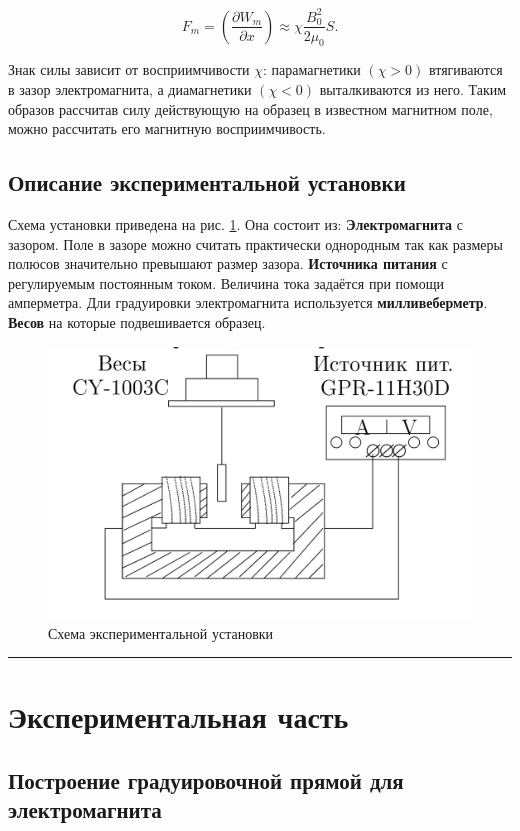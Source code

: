 \documentclass[a4paper,12pt]{article} %
\begin{document}
\[
F_m = \left( \frac{\partial W_m}{\partial x} \right) \approx \chi \frac{B_0^2}{2 \mu_0} S.
\]

Знак силы зависит от восприимчивости $\chi$: парамагнетики $(\chi > 0)$ втягиваются в зазор электромагнита, а диамагнетики $(\chi < 0)$ выталкиваются из него. Таким образов рассчитав силу действующую на образец в известном магнитном поле, можно рассчитать его магнитную восприимчивость.

\subsection{Описание экспериментальной установки}

Схема установки приведена на рис. \ref{fig:setup}. Она состоит из:
\textbf{Электромагнита} с зазором. Поле в зазоре можно считать практически однородным
так как размеры полюсов значительно превышают размер зазора. 
\textbf{Источника питания} с регулируемым постоянным током. Величина тока задаётся при
помощи амперметра. Дли градуировки электромагнита используется \textbf{милливеберметр}.
\textbf{Весов} на которые подвешивается образец.

\FloatBarrier

\begin{figure}
\begin{center}
\includegraphics[width=0.5\linewidth]{setup.png}
\caption{Схема экспериментальной установки}
\label{fig:setup}
\end{center}
\end{figure}

\medskip\hrule\medskip

\section{Экспериментальная часть}

\subsection{Построение градуировочной прямой для электромагнита}
\end{document}
